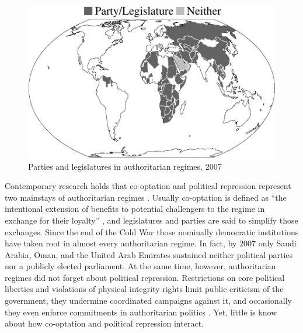 \begin{figure}
\centering
\includegraphics[width=1\linewidth]{./sections/01intro/worldmapTermpaperIntro.pdf}
\caption{Parties and legislatures in authoritarian regimes, 2007}
\label{fig:worldmapIntro}
\end{figure}
Contemporary research holds that co-optation and political 
repression represent two mainstays of authoritarian regimes 
\citep[21f.]{Gerschewski.2013}. Usually co-optation 
is defined as ``the intentional extension of benefits to 
potential challengers to the regime in exchange for their 
loyalty'' \citep[333]{Frantz.2014}, and legislatures and 
parties are said to simplify those exchanges. Since 
the end of the Cold War those nominally democratic 
institutions have taken root in almost every authoritarian 
regime. In fact, by 2007 only Saudi Arabia, Oman, and the 
United Arab Emirates sustained neither political parties nor
a publicly elected parliament. At the same time, however, 
authoritarian regimes did not forget about political 
repression. Restrictions on core political liberties 
and violations of physical integrity rights limit public 
criticism of the government, they undermine coordinated 
campaigns against it, and occasionally they even enforce 
commitments in authoritarian politics 
\citep[33,38]{Wintrobe.1998}. Yet, little is know about how 
co-optation and political repression interact.

